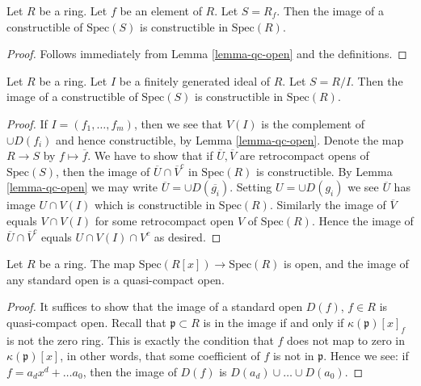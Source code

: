 \begin{lemma}
\label{lemma-open-fp}
Let $R$ be a ring.
Let $f$ be an element of $R$.
Let $S = R_f$.
Then the image of a constructible of $\text{Spec}(S)$
is constructible in $\text{Spec}(R)$.
\end{lemma}

\begin{proof}
Follows immediately from Lemma \ref{lemma-qc-open} and the
definitions.
\end{proof}

\begin{lemma}
\label{lemma-closed-fp}
Let $R$ be a ring.
Let $I$ be a finitely generated ideal of $R$.
Let $S = R/I$.
Then the image of a constructible of $\text{Spec}(S)$
is constructible in $\text{Spec}(R)$.
\end{lemma}

\begin{proof}
If $I = (f_1,\ldots,f_m)$, then we see that
$V(I)$ is the complement of $\cup D(f_i)$ and
hence constructible, by Lemma \ref{lemma-qc-open}.
Denote the map $R \to S$ by $f \mapsto \overline{f}$.
We have to show that if $\overline{U}, \overline{V}$
are retrocompact opens of $\text{Spec}(S)$, then the
image of $\overline{U} \cap \overline{V}^c$
in $\text{Spec}(R)$ is constructible.
By Lemma \ref{lemma-qc-open} we may write
$\overline{U} = \cup D(\overline{g_i})$.
Setting ${U} = \cup D({g_i})$ we see $\overline{U}$
has image $U \cap V(I)$ which is constructible in
$\text{Spec}(R)$. Similarly the image of $\overline{V}$ equals
$V \cap V(I)$ for some retrocompact open $V$ of $\text{Spec}(R)$.
Hence the image of $\overline{U} \cap \overline{V}^c$
equals $U \cap V(I) \cap V^c$ as desired.
\end{proof}

\begin{lemma}
\label{lemma-affineline-open}
Let $R$ be a ring. The map $\text{Spec}(R[x]) \to \text{Spec}(R)$
is open, and the image of any standard open is a quasi-compact
open.
\end{lemma}

\begin{proof}
It suffices to show that the image of a standard open
$D(f)$, $f\in R$ is quasi-compact open.
Recall that $\mathfrak p\subset R$ is in the image
if and only if $\kappa(\mathfrak p)[x]_f$ is not the
zero ring. This is exactly the condition that $f$ does not map
to zero in $\kappa(\mathfrak p)[x]$, in other words, that
some coefficient of $f$ is not in $\mathfrak p$.
Hence we see: if $f = a_d x^d + \ldots a_0$, then
the image of $D(f)$ is $D(a_d) \cup \ldots \cup D(a_0)$.
\end{proof}

